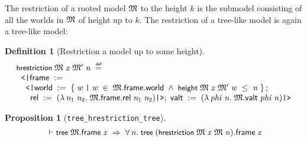 \documentclass[letterpaper]{article}
\newtheorem{defn}{Definition}
\newtheorem{prop}{Proposition}
\renewcommand{\HOLConst}[1]{{\textsf{\upshape\small #1}}}
\renewcommand{\HOLinline}[1]{\ensuremath{#1}}
\newenvironment{holmath}{\begin{displaymath}\begin{array}{l}}{\end{array}\end{displaymath}\ignorespacesafterend}
\begin{document}
The restriction of a rooted model \HOLinline{\HOLFreeVar{\ensuremath{\mathfrak{M}}}} to the height $k$ is the submodel consisting of all the worlds in \HOLinline{\HOLFreeVar{\ensuremath{\mathfrak{M}}}} of height up to $k$. The restriction of a tree-like model is again a tree-like model:
\begin{defn}[Restriction a model up to some height]
\begin{holmath}
  \HOLConst{hrestriction}\;\HOLFreeVar{\ensuremath{\mathfrak{M}}}\;\HOLFreeVar{x}\;\HOLFreeVar{\ensuremath{\mathfrak{M}'}}\;\HOLFreeVar{n}\;\HOLSymConst{\HOLTokenDefEquality{}}\\
\;\;\HOLTokenLeftrec{}\HOLFieldName{frame}\;:=\\
\;\;\;\;\HOLTokenLeftrec{}\HOLFieldName{world}\;:=\;\HOLTokenLeftbrace{}\HOLBoundVar{w}\;\HOLTokenBar{}\;\HOLBoundVar{w}\;\HOLSymConst{\HOLTokenIn{}}\;\HOLFreeVar{\ensuremath{\mathfrak{M}}}.\HOLFieldName{frame}.\HOLFieldName{world}\;\HOLSymConst{\HOLTokenConj{}}\;\HOLConst{height}\;\HOLFreeVar{\ensuremath{\mathfrak{M}}}\;\HOLFreeVar{x}\;\HOLFreeVar{\ensuremath{\mathfrak{M}'}}\;\HOLBoundVar{w}\;\HOLSymConst{\HOLTokenLeq{}}\;\HOLFreeVar{n}\HOLTokenRightbrace{};\\
\;\;\;\;\;\;\HOLFieldName{rel}\;:=\;(\HOLTokenLambda{}\HOLBoundVar{n\sb{\mathrm{1}}}\;\HOLBoundVar{n\sb{\mathrm{2}}}.\;\HOLFreeVar{\ensuremath{\mathfrak{M}}}.\HOLFieldName{frame}.\HOLFieldName{rel}\;\HOLBoundVar{n\sb{\mathrm{1}}}\;\HOLBoundVar{n\sb{\mathrm{2}}})\HOLTokenRightrec{};\;\HOLFieldName{valt}\;:=\;(\HOLTokenLambda{}\HOLBoundVar{phi}\;\HOLBoundVar{n}.\;\HOLFreeVar{\ensuremath{\mathfrak{M}}}.\HOLFieldName{valt}\;\HOLBoundVar{phi}\;\HOLBoundVar{n})\HOLTokenRightrec{}
\end{holmath}
\end{defn}

\begin{prop}[\texttt{tree_hrestriction_tree}]
\begin{holmath}
  \ensuremath{\HOLTokenTurnstile}\HOLConst{tree}\;\HOLFreeVar{\ensuremath{\mathfrak{M}}}.\HOLFieldName{frame}\;\HOLFreeVar{x}\;\HOLSymConst{\HOLTokenImp{}}\;\HOLSymConst{\HOLTokenForall{}}\HOLBoundVar{n}.\;\HOLConst{tree}\;(\HOLConst{hrestriction}\;\HOLFreeVar{\ensuremath{\mathfrak{M}}}\;\HOLFreeVar{x}\;\HOLFreeVar{\ensuremath{\mathfrak{M}}}\;\HOLBoundVar{n}).\HOLFieldName{frame}\;\HOLFreeVar{x}
\end{holmath}
\end{prop}
\end{document}
